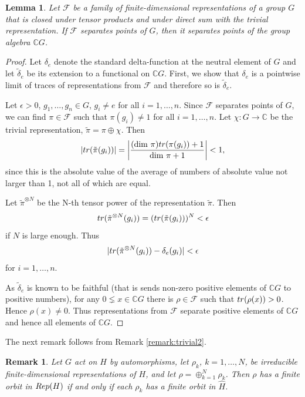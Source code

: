 \documentclass[11 pt, leqno, hidelinks]{amsart}%
\theoremstyle{plain}
\newtheorem{lemma}[theorem]{Lemma}
\newtheorem{remark}[theorem]{Remark}
\numberwithin{equation}{section}
\newcommand{\tr}{\textup{tr}}
\newcommand{\Rep}{\textup{Rep}}
\begin{document}
\begin{lemma}\label{SeparatingPointsOfGroupAlgebra} Let $\mathcal F$ be a family of finite-dimensional representations of a group $G$ that is closed under tensor products and under  direct sum with the trivial representation. If $\mathcal F$ separates points of $G$, then it separates points of the group algebra $\mathbb C G$.
\end{lemma}
\begin{proof} Let $\delta_e$ denote the standard delta-function at the neutral element of $G$  and let $\tilde \delta_e$ be its extension to a functional on $\mathbb CG$. First, we show that $\delta_e$ is a pointwise limit of traces of representations from $\mathcal F$ and therefore so is $\tilde \delta_e$.

 Let $\epsilon>0$, $g_{1}, \ldots, g_{n} \in G$, $g_{i} \neq e$ for all $i=1,
\ldots, n$. Since $\mathcal F$ separates points of $G$, we can find $\pi\in \mathcal F$ such that $\pi(g_{i}) \neq1$ for all
$i=1, \ldots, n$. Let $\chi: G \to \mathbb{C}$ be the trivial representation,
$\tilde \pi= \pi \oplus \chi$. Then
\[
|\tr (\tilde \pi(g_{i}))| = \left| \frac{(\dim\,\pi)\tr (\pi(g_{i})) +1}{\dim\,\pi+
1}\right|  < 1,
\]
since this is the absolute value of the average of numbers of absolute value not
larger than 1, not all of which are equal.

Let $\tilde \pi^{\otimes N}$ be the N-th tensor power of the representation
$\tilde \pi$. Then
\[
\tr (\tilde \pi^{\otimes N} (g_{i})) = (\tr (\tilde \pi(g_{i})))^{N} < \epsilon
\]
if $N$ is large enough. Thus
\[
|\tr (\tilde \pi^{\otimes N}(g_{i})) - \delta_{e}(g_{i})| < \epsilon
\]
for $i = 1, \ldots, n$.

As $\tilde\delta_e$ is known to be faithful (that is sends non-zero positive elements of $\mathbb C G$ to positive numbers), for any $0\lneq x \in \mathbb CG$ there is $\rho\in \mathcal F$ such that $\tr (\rho(x)) > 0$. Hence $\rho(x) \neq 0$. Thus representations from $\mathcal F$ separate positive elements of $\mathbb CG$  and hence all elements of $\mathbb CG$.
\end{proof}

The next remark follows from Remark \ref{remark:trivial2}.

\begin{remark}\label{DecompositionIrreducible}  Let $G$ act on $H$ by automorphisms, let $\rho_k$, $k=1, \ldots, N$, be irreducible finite-dimensional representations of $H$, and let $\rho = \oplus_{k=1}^N \rho_k$. Then $\rho$ has a finite orbit in $\Rep(H)$ if and only if each $\rho_k$ has a finite orbit in $\widehat H$.
\end{remark}
\end{document}
